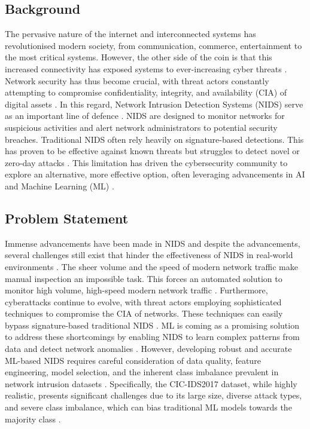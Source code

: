 \subsection{Background}
The pervasive nature of the internet and interconnected systems has revolutionised modern society, from communication, commerce, entertainment to the most critical systems. However, the other side of the coin is that this increased connectivity has exposed systems to ever-increasing cyber threats \parencite{googlecloud2025threat, govuk2025cyber}. Network security has thus become crucial, with threat actors constantly attempting to compromise confidentiality, integrity, and availability (CIA) of digital assets \parencite{itgovernance2025cia, securityscorecard2025cia}. In this regard, Network Intrusion Detection Systems (NIDS) serve as an important line of defence \parencite{sharma2024advancements}. NIDS are designed to monitor networks for suspicious activities and alert network administrators to potential security breaches. Traditional NIDS often rely heavily on signature-based detections. This has proven to be effective against known threats but struggles to detect novel or zero-day attacks \parencite{kaur2024challenges, ali2024challenges}. This limitation has driven the cybersecurity community to explore an alternative, more effective option, often leveraging advancements in AI and Machine Learning (ML) \parencite{singh2025comparative, akoto2024machine}.

\subsection{Problem Statement}
Immense advancements have been made in NIDS and despite the advancements, several challenges still exist that hinder the effectiveness of NIDS in real-world environments \parencite{sharma2024advancements, bistech2025networking}. The sheer volume and the speed of modern network traffic make manual inspection an impossible task. This forces an automated solution to monitor high volume, high-speed modern network traffic \parencite{bistech2025networking, researchgate2024challenges}. Furthermore, cyberattacks continue to evolve, with threat actors employing sophisticated techniques to compromise the CIA of networks. These techniques can easily bypass signature-based traditional NIDS \parencite{prophaze2025ids, researchgate2025comparative}. ML is coming as a promising solution to address these shortcomings by enabling NIDS to learn complex patterns from data and detect network anomalies \parencite{brilliance2025ml, irjmets2025nids}. However, developing robust and accurate ML-based NIDS requires careful consideration of data quality, feature engineering, model selection, and the inherent class imbalance prevalent in network intrusion datasets \parencite{semanticscholar2025imbalanced, arxiv2025defensive}. Specifically, the CIC-IDS2017 dataset, while highly realistic, presents significant challenges due to its large size, diverse attack types, and severe class imbalance, which can bias traditional ML models towards the majority class \parencite{unb2017cicids, pubmedcentral2025ids}.

